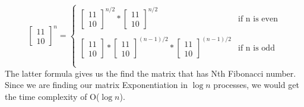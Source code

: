 \documentclass[12pt]{article}
\begin{document}
\begin{equation}
    \begin{bmatrix}
        1 1  \\
        1 0
    \end{bmatrix}^{n} =
  \begin{cases}
    \begin{bmatrix}
        1 1  \\
        1 0
    \end{bmatrix}^{n/2} 
    * 
    \begin{bmatrix}
        1 1  \\
        1 0
    \end{bmatrix}^{n/2} & \text{if n is even} \\\\
    \begin{bmatrix}
        1 1  \\
        1 0
    \end{bmatrix}
    *
    \begin{bmatrix}
        1 1  \\
        1 0
    \end{bmatrix}^{(n-1)/2} 
    * 
    \begin{bmatrix}
        1 1  \\
        1 0
    \end{bmatrix}^{(n-1)/2}& \text{if n is odd} \\\\
  \end{cases}
\end{equation}
The latter formula gives us the find the matrix that has Nth Fibonacci number. Since we are finding our matrix Exponentiation in $\log{n}$ processes, we would get the time complexity of O($\log{n}$).
\clearpage
\end{document}
